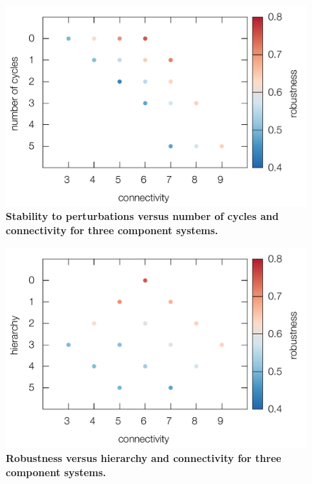 

\pagebreak

\begin{figure}[!ht]
\centering
\noindent\includegraphics[width=0.7\columnwidth]{fig/connectcycle3D3x3.pdf}
\caption{{\bf Stability to perturbations versus number of cycles and connectivity for three component systems.} }
\label{fig:connectcycle3D3x3}
\end{figure}

\pagebreak

\begin{figure}[!ht]
\centering
\noindent\includegraphics[width=0.7\columnwidth]{fig/connectdist3D3x3.pdf}
\caption{{\bf Robustness versus hierarchy and connectivity for three component systems.} }
\label{fig:connectdist3D3x3}
\end{figure}

\pagebreak

